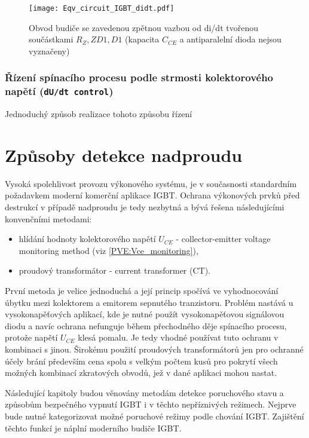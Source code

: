         \begin{figure}[ht!]
          \centering
          \texttt{[image: Eqv\_circuit\_IGBT\_didt.pdf]}
          \caption{Obvod budiče se zavedenou zpětnou vazbou od di/dt tvořenou
                   součástkami $R_Z, ZD1, D1$ (kapacita $C_{CE}$ a antiparalelní
                   dioda nejsou vyznačeny)}\label{VE:fig_didt}
        \end{figure}

      \subsubsection{Řízení spínacího procesu podle strmosti kolektorového napětí (\texttt{dU/dt control}) }
        Jednoduchý způsob realizace tohoto způsobu řízení

   \section{Způsoby detekce nadproudu}%

     Vysoká spolehlivost provozu výkonového systému, je v současnosti standardním požadavkem 
     moderní komerční aplikace IGBT. Ochrana výkonových prvků před destrukcí v případě nadproudu je 
     tedy nezbytná a bývá řešena následujícími konvenčními metodami:
     \begin{itemize}
       \item hlídání hodnoty kolektorového napětí $U_{CE}$ - collector-emitter voltage monitoring  
             method (viz \ref{PVE:Vce_monitoring}),
       \item proudový transformátor - current transformer (CT).
     \end{itemize}
     První metoda je velice jednoduchá a její princip spočívá ve vyhodnocování úbytku mezi 
     kolektorem a emitorem sepnutého tranzistoru. Problém nastává u vysokonapěťových aplikací, kde 
     je nutné použít vysokonapěťovou signálovou diodu a navíc ochrana nefunguje během přechodného 
     děje spínacího procesu, protože napětí $U_{CE}$ klesá pomalu. Je tedy vhodné používat tuto 
     ochranu v kombinaci s jinou. Širokému použití proudových transformátorů jen pro ochranné účely 
     brání především cena spolu s velkým počtem kusů pro pokrytí všech možných kombinací zkratových 
     obvodů, jež v dané aplikaci mohou nastat.

     Následující kapitoly budou věnovány metodám detekce poruchového stavu a způsobům bezpečného 
     vypnutí IGBT i v těchto nepříznivých režimech. Nejprve bude nutné kategorizovat možné 
     poruchové režimy podle chování IGBT. Zajištění těchto funkcí je náplní moderního budiče IGBT.


